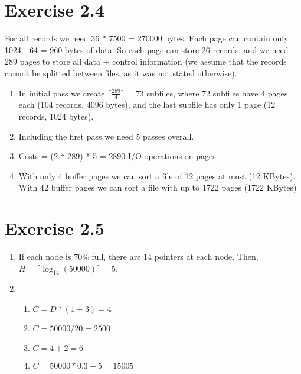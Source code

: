 \documentclass[10pt]{article}
\begin{document}
  \section*{Exercise 2.4}
  For all records we need 36 * 7500 = 270000 bytes. Each page can contain only 1024 - 64 = 960 bytes of data. So each page can store 26 records, and we need 289 pages to store all data + control information (we assume that the records cannot be splitted between files, as it was not stated otherwise).
   \begin{enumerate}[label=\arabic*.]
      \item
      	In initial pass we create $\lceil \frac{289}{4} \rceil = 73$ subfiles, where 72 subfiles have 4 pages each (104 records, 4096 bytes), and the last subfile has only 1 page (12 records, 1024 bytes).
      \item
      	Including the first pass we need 5 passes overall.
      \item
      	Costs = (2 * 289) * 5 = 2890 I/O operations on pages
      \item
      	With only 4 buffer pages we can sort a file of 12 pages at most (12 KBytes).\\
      	With 42 buffer pages we can sort a file with up to 1722 pages (1722 KBytes)

  \end{enumerate}


  \section*{Exercise 2.5}
   \begin{enumerate}[label=\arabic*.]
      \item
      	If each node is 70\% full, there are 14 pointers at each node. Then, $H = \lceil \log_{14}(50000) \rceil = 5$.
      \item
      	\begin{enumerate}[label=\alph*.]
          \item $C = D*(1+3) = 4$
          \item $C = 50000 / 20 = 2500$
          \item $C = 4 + 2 = 6$
          \item $C = 50000 * 0.3 + 5 = 15005$
        \end{enumerate}

  \end{enumerate}
\end{document}

